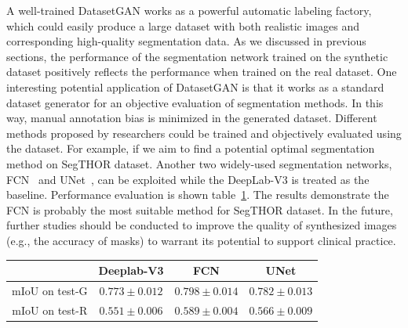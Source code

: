 \documentclass[conference]{IEEEtran}
\begin{document}
A well-trained DatasetGAN works as a powerful automatic labeling factory, which could easily produce a large dataset with both realistic images and corresponding high-quality segmentation data. As we discussed in previous sections, the performance of the segmentation network trained on the synthetic dataset positively reflects the performance when trained on the real dataset. 
One interesting potential application of DatasetGAN is that it works as a standard dataset generator for an objective evaluation of segmentation methods. 
In this way, manual annotation bias is minimized in the generated dataset. Different methods proposed by researchers could be trained and objectively evaluated using the dataset. 
For example, if we aim to find a potential optimal segmentation method on SegTHOR dataset. 
Another two widely-used segmentation networks, FCN~\cite{long2015fully} and UNet~\cite{Ronneberger2015UNetCN}, can be exploited while the DeepLab-V3 is treated as the baseline. 
Performance evaluation is shown table~\ref{table:diff_networks}. The results demonstrate the FCN is probably the most suitable method for SegTHOR dataset. 
In the future, further studies should be conducted to improve the quality of synthesized images (e.g., the accuracy of masks) to warrant its potential to support clinical practice.

\begin{table}[h!]
  \centering
  \begin{tabular}{c||c|c|c}
    \hline 
     & \textbf{Deeplab-V3} & \textbf{FCN} & \textbf{UNet} \\
    \hline
    mIoU on test-G & $0.773\pm 0.012$ & $\mathbf{0.798\pm 0.014}$ & $0.782\pm 0.013$ \\
    mIoU on test-R &  $0.551\pm 0.006$ & $\mathbf{0.589\pm 0.004}$ & $0.566\pm 0.009$  \\
    \hline
  \end{tabular}
  \vspace{0.05cm}
  \label{table:diff_networks}
\end{table} 


\vspace{-0.2cm}
\scriptsize{


}
\end{document}
